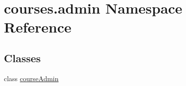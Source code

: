 \hypertarget{namespacecourses_1_1admin}{}\section{courses.\+admin Namespace Reference}
\label{namespacecourses_1_1admin}
\subsection*{Classes}
\begin{DoxyCompactItemize}
\item 
class \hyperlink{classcourses_1_1admin_1_1courseAdmin}{course\+Admin}
\end{DoxyCompactItemize}
